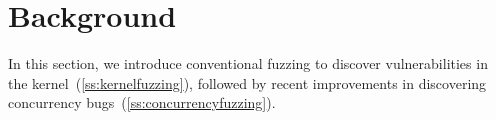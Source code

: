 \section{Background}
\label{s:background}

%


In this section, we introduce conventional fuzzing to discover
vulnerabilities in the kernel~(\autoref{ss:kernelfuzzing}), followed
by recent improvements in discovering concurrency
bugs~(\autoref{ss:concurrencyfuzzing}).










